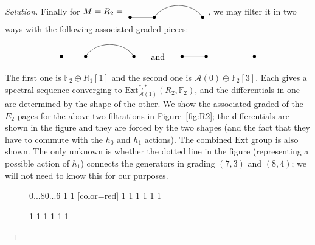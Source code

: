 \documentclass{amsart}
\newcommand{\Ext}{\mathrm{Ext}}
\newcommand{\Steenrod}{\mathcal{A}}
\newcommand{\Aone}{\Steenrod(1)}
\newcommand{\Azero}{\Steenrod(0)}
\newcommand{\FF}{\mathbb{F}}
\begin{document}
\begin{proof}[Solution]
Finally for $M=R_2=\vcenter{\hbox{\begin{tikzpicture}
      \foreach \i in {0,1,3}{\node at (\i,0) {$\bullet$};}
      \draw (0,0)--(1,0);
      \draw (1,0) to[out=60,in=120] (3,0);
    \end{tikzpicture}}}$, we may filter it in two ways with the following associated graded pieces:
\[
  \begin{tikzpicture}
    \begin{scope}[xshift=-5cm]
      \foreach \i in {0,1,3}{\node at (\i,0) {$\bullet$};}
      \draw (1,0) to[out=60,in=120] (3,0);
    \end{scope}
      \node at (-1,0) {\text{and}};
      \foreach \i in {0,1,3}{\node at (\i,0) {$\bullet$};}
      \draw (0,0)--(1,0);
    \end{tikzpicture}
\]
The first one is $\FF_2\oplus R_1[1]$ and the second one is
$\Azero\oplus\FF_2[3]$. Each gives a spectral sequence converging to
$\Ext_{\Aone}^{*,*}(R_2,\FF_2)$, and the differentials in one are
determined by the shape of the other. We show the associated graded of
the $E_2$ pages for the above two filtrations in Figure~\ref{fig:R2};
the differentials are shown in the figure and they are forced by the
two shapes (and the fact that they have to commute with the $h_0$ and
$h_1$ actions). The combined $\Ext$ group is also shown. The only
unknown is whether the dotted line in the figure (representing a
possible action of $h_1$) connects the generators in grading $(7,3)$
and $(8,4)$; we will not need to know this for our purposes.


\begin{figure}
  \centering
\begin{sseq}[entrysize=5mm, gridstroke=.05pt]{0...8}{0...6}
\ssdropbull
{} 1
\ssdropbull \ssstroke[color=red]
 1
\ssdropbull \ssstroke[color=red]
[color=red]
\ssdropbull \ssstroke[color=red]
 1
\ssdropbull \ssstroke[color=red]
 1
\ssdropbull \ssstroke[color=red]
 1
\ssdropbull \ssstroke[color=red]
 1
\ssdropbull \ssstroke[color=red]
 1
\ssdropbull \ssstroke[color=red]
 1
\ssdropbull \ssstroke[color=red]

\ssdropbull
{} 1
\ssdropbull \ssstroke[color=red]
 1
\ssdropbull \ssstroke[color=red]
 1
\ssdropbull \ssstroke[color=red]
 1
\ssdropbull \ssstroke[color=red]
 1
\ssdropbull \ssstroke[color=red]
 1
\ssdropbull \ssstroke[color=red]


\end{sseq}
\end{figure}
\end{proof}
\end{document}
